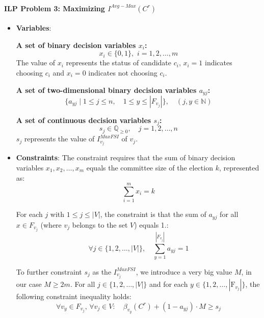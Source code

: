 \documentclass{article}
\begin{document}
\paragraph*{ILP Problem 3: Maximizing  $I^{Avg-Max}(C^{r})$}

\begin{itemize}

  \item \textbf{Variables}: 

\textbf{A set of binary decision variables $x_i$:} \[  x_i \in \{0, 1\} , \,\, i=1,2,\dots, m \] The value of $x_i$ represents the status of candidate $c_i$, \(x_i = 1\) indicates choosing $c_i$ and \(x_i = 0\) indicates not choosing $c_i$.


\textbf{A set of two-dimensional binary decision variables \( a_{yj} \):}
\[
\{ a_{yj} \mid 1 \leq j \leq n, \quad 1 \leq y \leq |F_{v_j}| \},  \quad (j, y \in \mathbb{N})
\]

\textbf{A set of continuous decision variables $s_j$:} 
 \[  s_j\in \mathbb{Q}_{\geq 0}, \quad j=1,2, \dots,n \] 
$s_j$ represents the value of $I_{v_j}^{MaxFSI}$ of \(v_j\).
    \item \textbf{Constraints}:
The constraint requires that the sum of binary decision variables \(x_1, x_2, \ldots, x_m\) equals the committee size of the election \(k\), represented as:
\begin{equation} \sum_{i=1}^m x_i = k \label{eq:ilpavgmax1}
\end{equation}

For each \(j\) with \(1 \leq j \leq |V|\), the constraint is that the sum of \( a_{yj} \) for all \( x \in F_{v_j} \) (where \( v_j \) belongs to the set \( V \)) equals 1.:
\begin{equation} \forall j \in \{1, 2, \ldots, |V|\}, \quad \sum_{y=1}^{|F_{v_j}|} a_{yj} = 1 \label{eq:ilpavgmax2}
\end{equation}

To further constraint $s_j$ as the $I_{v_j}^{MaxFSI}$, we introduce a very big value $M$, in our case $M \geq  2m$. For all \( j \in \{1, 2, \ldots, |V|\} \) and for each  \( y \in \{1, 2, \ldots, |\text{F}_{v_j}|\} \), the following constraint inequality holds:
\begin{equation} \forall v_y \in F_{v_j}, \,  \forall v_j \in V :\quad \beta_{v_y}(C^{r}) + (1 - a_{yj})\cdot M \geq s_j \label{eq:ilpavgmax3}
\end{equation}
  

\end{itemize}
\end{document}
